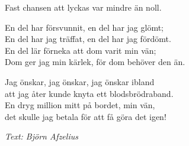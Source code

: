 Fast chansen att lyckas var mindre än noll.\par
\vspace{10pt}
En del har försvunnit, en del har jag glömt;\\
En del har jag träffat, en del har jag fördömt.\\
En del lär förneka att dom varit min vän;\\
Dom ger jag min kärlek, för dom behöver den än.\par
\vspace{10pt}
Jag önskar, jag önskar, jag önskar ibland\\
att jag åter kunde knyta ett blodsbrödraband.\\
En dryg million mitt på bordet, min vän,\\
det skulle jag betala för att få göra det igen!\par
\vspace{10pt}
{\footnotesize\textit{Text: Björn Afzelius}}

